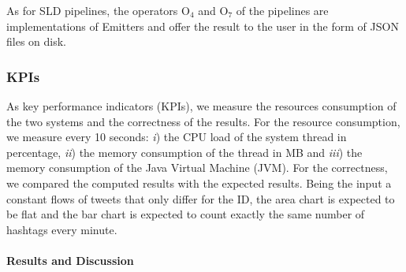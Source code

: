 As for SLD pipelines, the operators O$_4$ and O$_7$ of the \sti{} pipelines are implementations of \textsf{Emitter}s and offer the result to the user in the form of JSON files on disk.

\subsubsection{KPIs}
As key performance indicators (KPIs), we measure  the resources consumption of the two systems and the correctness of the results. For the resource consumption, we measure every 10 seconds: \textit{i}) the CPU load of the system thread in percentage, \textit{ii}) the memory consumption of the thread in MB and \textit{iii}) the memory consumption of the Java Virtual Machine (JVM). For the correctness, we compared the computed results with the expected results. Being the input a constant flows of tweets that only differ for the ID, the area chart is expected to be flat and the bar chart is expected to count exactly the same number of hashtags every minute.


\paragraph{Results and Discussion}\label{sec:comp-mod-eval-performace-res}

